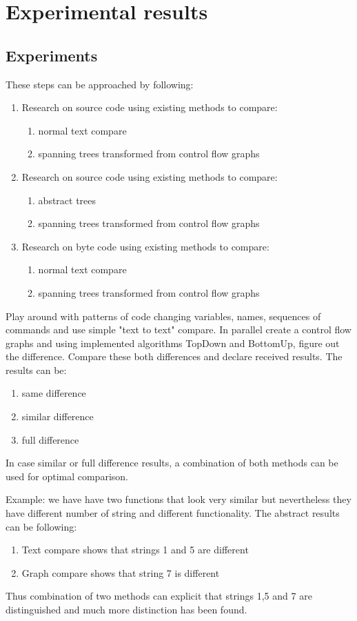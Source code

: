 \chapter{Experimental results}
\label{chap:experimental}
\section{Experiments}
These steps can be approached by following:

\begin{enumerate}
  \item Research on source code using existing methods to compare:
  	\begin{enumerate}
   	 	\item normal text compare
   		 \item spanning trees transformed from control flow graphs
	 \end{enumerate}	
  \item Research on source code using existing methods to compare:
  \begin{enumerate}
    \item abstract trees
    \item spanning trees transformed from control flow graphs
  \end{enumerate}
  \item Research on byte code using existing methods to compare:
  \begin{enumerate}
    \item normal text compare
    \item spanning trees transformed from control flow graphs
  \end{enumerate}
\end{enumerate}

	
Play around with patterns of code changing variables, names, sequences of commands and use simple "text to text" compare. In parallel create a control flow graphs and using implemented algorithms TopDown and BottomUp, figure out the difference. Compare these both differences and declare received results.
The results can be: 
\begin{enumerate}
  \item same difference
  \item similar difference
  \item full difference
\end{enumerate}
In case similar or full difference results, a combination of both methods can be used for optimal comparison. 

Example: we have have two functions that look very similar but nevertheless they have different number of string and different functionality. The abstract results can be following:
\begin{enumerate}
	\item Text compare shows that strings 1 and 5 are different
	\item Graph compare shows that string 7 is different 
\end{enumerate}

Thus combination of two methods can explicit that strings 1,5 and 7 are distinguished and much more distinction has been found.